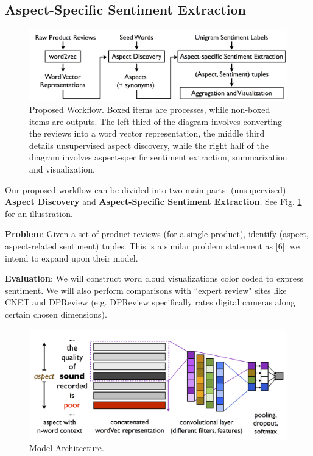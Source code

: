 \documentclass{article} %
\begin{document}
\subsection{Aspect-Specific Sentiment Extraction}



\begin{figure}[ht]
\begin{center}
\includegraphics[width=.85\columnwidth]{workflow.png}
\end{center}
\caption{Proposed Workflow. Boxed items are processes, while non-boxed items are outputs. The left third of the diagram involves converting the reviews into a word vector representation, the middle third details unsupervised aspect discovery, while the right half of the diagram involves aspect-specific sentiment extraction, summarization and visualization.}%
\label{workflow}
\end{figure}

Our proposed workflow can be divided into two main parts: (unsupervised) {\bf Aspect Discovery} and {\bf Aspect-Specific Sentiment Extraction}. See Fig. \ref{workflow} for an illustration.

\textbf{Problem}: Given a set of product reviews (for a single product), identify (aspect, aspect-related sentiment) tuples. This is a similar problem statement as [6]: we intend to expand upon their model.

\textbf{Evaluation}: We will construct word cloud visualizations color coded to express sentiment. We will also perform comparisons with ``expert review" sites like CNET and DPReview (e.g. DPReview specifically rates digital cameras along certain chosen dimensions).

\begin{figure}[ht]
\begin{center}
\includegraphics[width=.85\columnwidth]{model_architecture.png}
\end{center}
\caption{Model Architecture.}
\label{architecture}
\end{figure}
\end{document}
